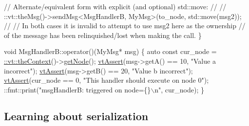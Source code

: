 \begin{DoxyCodeInclude}
  \textcolor{comment}{// Alternate/equivalent form with explicit (and optional) std::move:}
  \textcolor{comment}{//}
  \textcolor{comment}{//   ::vt::theMsg()->sendMsg<MsgHandlerB, MyMsg>(to\_node, std::move(msg2));}
  \textcolor{comment}{//}
  \textcolor{comment}{// In both cases it is invalid to attempt to use msg2 here as the ownership}
  \textcolor{comment}{// of the message has been relinquished/lost when making the call.}
\}

\textcolor{keywordtype}{void} MsgHandlerB::operator()(MyMsg* msg) \{
  \textcolor{keyword}{auto} \textcolor{keyword}{const} cur\_node = \hyperlink{namespacevt_a26551fe0e6e6a1371111df5b12c7e92c}{::vt::theContext}()->\hyperlink{structvt_1_1ctx_1_1_context_a0d52c263ce8516546a67443d9a86fa5f}{getNode}();
  \hyperlink{config__assert_8h_aeddd4990a496e91a0ca5d6c16437359b}{vtAssert}(msg->getA() == 10, \textcolor{stringliteral}{"Value a incorrect"});
  \hyperlink{config__assert_8h_aeddd4990a496e91a0ca5d6c16437359b}{vtAssert}(msg->getB() == 20, \textcolor{stringliteral}{"Value b incorrect"});
  \hyperlink{config__assert_8h_aeddd4990a496e91a0ca5d6c16437359b}{vtAssert}(cur\_node == 0, \textcolor{stringliteral}{"This handler should execute on node 0"});
  ::fmt::print(\textcolor{stringliteral}{"msgHandlerB: triggered on node=\{\}\(\backslash\)n"}, cur\_node);
\}
\end{DoxyCodeInclude}
\hypertarget{tutorial-1c}{}\subsection{Learning about serialization}\label{tutorial-1c}

